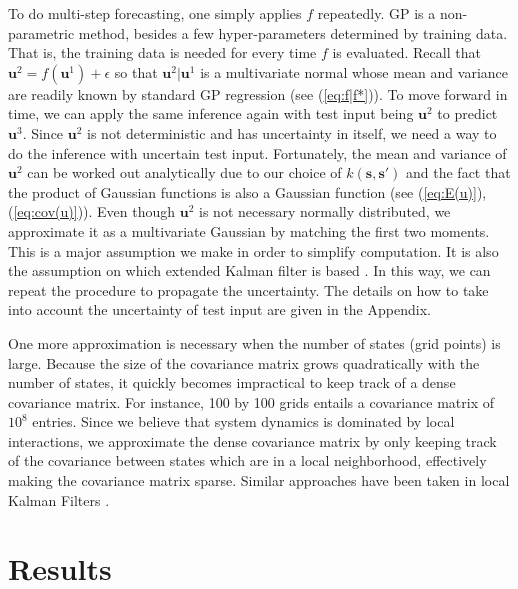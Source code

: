\documentclass[smallextended,natbib]{svjour3}       %
\begin{document}
To do multi-step forecasting, one simply applies $f$ repeatedly. GP is a non-parametric method, besides a few hyper-parameters determined by training data. That is, the training data is needed for every time $f$ is evaluated. Recall that $\mathbf{u}^{2}=f(\mathbf{u}^{1})+\epsilon$ so that $\mathbf{u}^{2}\vert\mathbf{u}^{1}$ is a multivariate normal whose mean and variance are readily known by standard GP regression (see (\ref{eq:f|f*})). To move forward in time, we can apply the same inference again with test input being $\mathbf{u}^{2}$ to predict $\mathbf{u}^3$. Since $\mathbf{u}^{2}$ is not deterministic and has uncertainty in itself, we need a way to do the inference with uncertain test input. Fortunately, the mean and variance of $\mathbf{u}^{2}$ can be worked out analytically due to our choice of $k(\mathbf{s},\mathbf{s}')$ and the fact that the product of Gaussian functions is also a Gaussian function (see (\ref{eq:E(u)}), (\ref{eq:cov(u)})). Even though $\mathbf{u}^{2}$ is not necessary normally distributed, we approximate it as a multivariate Gaussian by matching the first two moments. This is a major assumption we make in order to simplify computation. It is also the assumption on which extended Kalman filter is based \citep{jazwinski2007stochastic}. In this way, we can repeat the procedure to propagate the uncertainty. The details on how to take into account the uncertainty of test input are given in the Appendix. 

One more approximation is necessary when the number of states (grid points) is large. Because the size of the covariance matrix grows quadratically with the number of states, it quickly becomes impractical to keep track of a dense covariance matrix. For instance, 100 by 100 grids entails a covariance matrix of $10^{8}$ entries. Since we believe that system dynamics is dominated by local interactions, we approximate the dense covariance matrix by only keeping track of the covariance between states which are in a local neighborhood, effectively making the covariance matrix sparse. Similar approaches have been taken in local Kalman Filters \citep{Hunt2007}.


\section{Results} \label{sec:syn-data}
\end{document}
